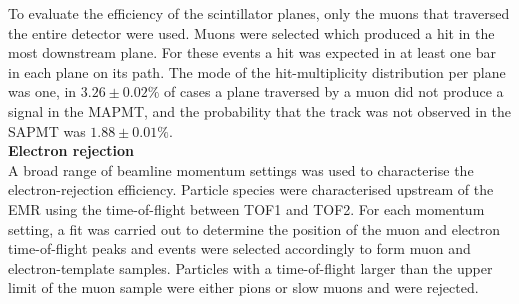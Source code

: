 To evaluate the efficiency of the scintillator planes, only the muons
that traversed the entire detector were used.
Muons were selected which produced a hit in the most downstream plane.
For these events a hit was expected in at least one bar in each plane
on its path.
The mode of the hit-multiplicity distribution per plane was one,
in $3.26\pm0.02\%$ of cases a plane traversed by a muon did not
produce a signal in the MAPMT, and the probability that the track was
not observed in the SAPMT was $1.88\pm0.01\%$. \\

\noindent\textbf{Electron rejection} \\
\noindent
A broad range of beamline momentum settings was used to characterise
the electron-rejection efficiency.
Particle species were characterised upstream of the EMR using the
time-of-flight between TOF1 and TOF2.
For each momentum setting, a fit was carried out to determine
the position of the muon and electron time-of-flight peaks and events were
selected accordingly to form muon and electron-template samples.
Particles with a time-of-flight larger than the upper limit of the
muon sample were either pions or slow muons and were rejected.

